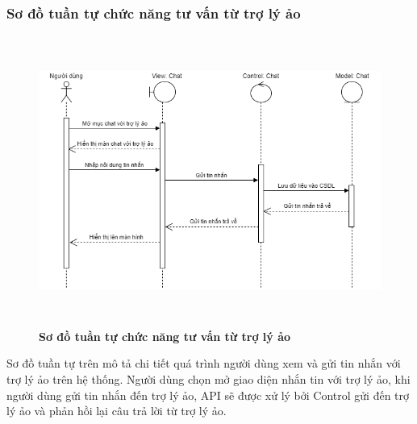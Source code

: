 \subsubsection{Sơ đồ tuần tự chức năng tư vấn từ trợ lý ảo}
\begin{figure}[H]
  \centering
  \includegraphics[width=14cm,height=9.5cm]{Images/sequence/sequence_chat_ai.png}
  \caption[Sơ đồ tuần tự chức năng tư vấn từ trợ lý ảo]{\bfseries \fontsize{12pt}{0pt}
  \selectfont Sơ đồ tuần tự chức năng tư vấn từ trợ lý ảo}
  \label{sequence_chat_ai} %
\end{figure}
Sơ đồ tuần tự trên mô tả chi tiết quá trình người dùng xem và gửi tin nhắn với trợ lý ảo trên hệ thống. Người dùng chọn mở giao diện nhắn tin với trợ lý ảo, 
khi người dùng gửi tin nhắn đến trợ lý ảo, API sẽ được xử lý bởi Control gửi đến trợ lý ảo và phản hồi lại câu trả lời từ trợ lý ảo.


